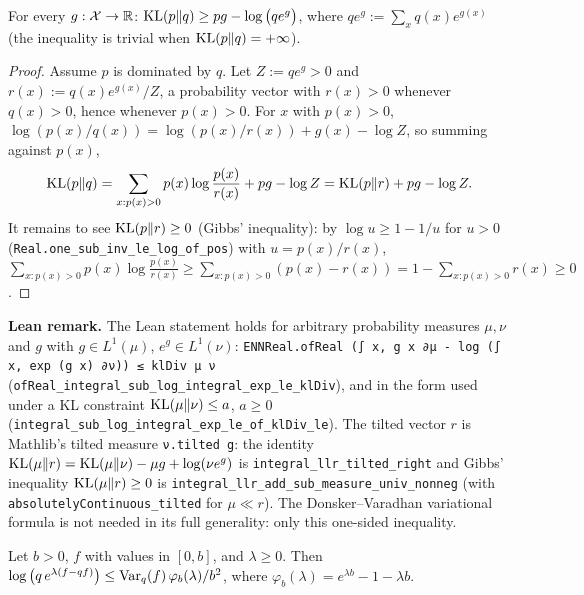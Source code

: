 \begin{lemma}\label{lem:donsker_varadhan_finite}
\leanok
For every $g : \mathcal X \to \mathbb{R}$: $\mathrm{KL}(p \| q) \ge pg - \log\big(q e^{g}\big)$, where
$q e^g := \sum_x q(x) e^{g(x)}$ (the inequality is trivial when $\mathrm{KL}(p\|q) = +\infty$).
\end{lemma}

\begin{proof}
\leanok
Assume $p$ is dominated by $q$. Let $Z := q e^g > 0$ and $r(x) := q(x) e^{g(x)}/Z$, a probability
vector with $r(x) > 0$ whenever $q(x) > 0$, hence whenever $p(x) > 0$. For $x$ with $p(x) > 0$,
$\log(p(x)/q(x)) = \log(p(x)/r(x)) + g(x) - \log Z$, so summing against $p(x)$,
\[
  \mathrm{KL}(p \| q) = \sum_{x : p(x) > 0} p(x)\log\frac{p(x)}{r(x)} + pg - \log Z = \mathrm{KL}(p \| r) + pg - \log Z .
\]
It remains to see $\mathrm{KL}(p \| r) \ge 0$ (Gibbs' inequality): by $\log u \ge 1 - 1/u$ for $u > 0$
(\texttt{Real.one\_sub\_inv\_le\_log\_of\_pos}) with $u = p(x)/r(x)$,
$\sum_{x : p(x) > 0} p(x)\log\frac{p(x)}{r(x)} \ge \sum_{x : p(x) > 0} (p(x) - r(x)) = 1 - \sum_{x : p(x) > 0} r(x) \ge 0$.
\end{proof}

\textbf{Lean remark.} The Lean statement holds for arbitrary probability measures $\mu, \nu$
and $g$ with $g \in L^1(\mu)$, $e^g \in L^1(\nu)$:
\texttt{ENNReal.ofReal (∫ x, g x ∂μ - log (∫ x, exp (g x) ∂ν)) ≤ klDiv μ ν}
(\texttt{ofReal\_integral\_sub\_log\_integral\_exp\_le\_klDiv}), and in the form used under a KL
constraint $\mathrm{KL}(\mu\|\nu) \le a$, $a \ge 0$ (\texttt{integral\_sub\_log\_integral\_exp\_le\_of\_klDiv\_le}).
The tilted vector $r$ is Mathlib's tilted measure \texttt{ν.tilted g}: the identity
$\mathrm{KL}(\mu\|r) = \mathrm{KL}(\mu\|\nu) - \mu g + \log(\nu e^g)$ is \texttt{integral\_llr\_tilted\_right} and
Gibbs' inequality $\mathrm{KL}(\mu \| r) \ge 0$ is \texttt{integral\_llr\_add\_sub\_measure\_univ\_nonneg}
(with \texttt{absolutelyContinuous\_tilted} for $\mu \ll r$). The Donsker--Varadhan variational
formula is not needed in its full generality: only this one-sided inequality.

\begin{lemma}\label{lem:bernstein_mgf_bounded}
\leanok
Let $b > 0$, $f$ with values in $[0, b]$, and $\lambda \ge 0$. Then
$\log\big(q\, e^{\lambda(f - qf)}\big) \le \operatorname{Var}_q(f)\, \varphi_b(\lambda)/b^2$,
where $\varphi_b(\lambda) = e^{\lambda b} - 1 - \lambda b$.
\end{lemma}

